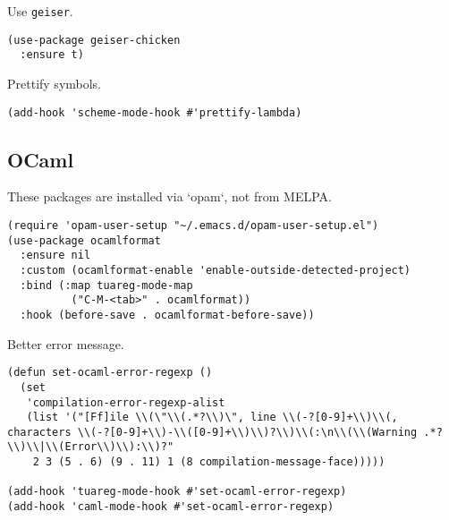 \documentclass[a4paper,11pt]{article}
\begin{document}
Use \texttt{geiser}.
\begin{verbatim}
(use-package geiser-chicken
  :ensure t)
\end{verbatim}

Prettify symbols.
\begin{verbatim}
(add-hook 'scheme-mode-hook #'prettify-lambda)
\end{verbatim}

\subsection{OCaml}
\label{sec:orgcb35439}
These packages are installed via `opam`, not from MELPA.
\begin{verbatim}
(require 'opam-user-setup "~/.emacs.d/opam-user-setup.el")
(use-package ocamlformat
  :ensure nil
  :custom (ocamlformat-enable 'enable-outside-detected-project)
  :bind (:map tuareg-mode-map
	      ("C-M-<tab>" . ocamlformat))
  :hook (before-save . ocamlformat-before-save))
\end{verbatim}

Better error message.
\begin{verbatim}
(defun set-ocaml-error-regexp ()
  (set
   'compilation-error-regexp-alist
   (list '("[Ff]ile \\(\"\\(.*?\\)\", line \\(-?[0-9]+\\)\\(, characters \\(-?[0-9]+\\)-\\([0-9]+\\)\\)?\\)\\(:\n\\(\\(Warning .*?\\)\\|\\(Error\\)\\):\\)?"
    2 3 (5 . 6) (9 . 11) 1 (8 compilation-message-face)))))

(add-hook 'tuareg-mode-hook #'set-ocaml-error-regexp)
(add-hook 'caml-mode-hook #'set-ocaml-error-regexp)
\end{verbatim}
\end{document}
